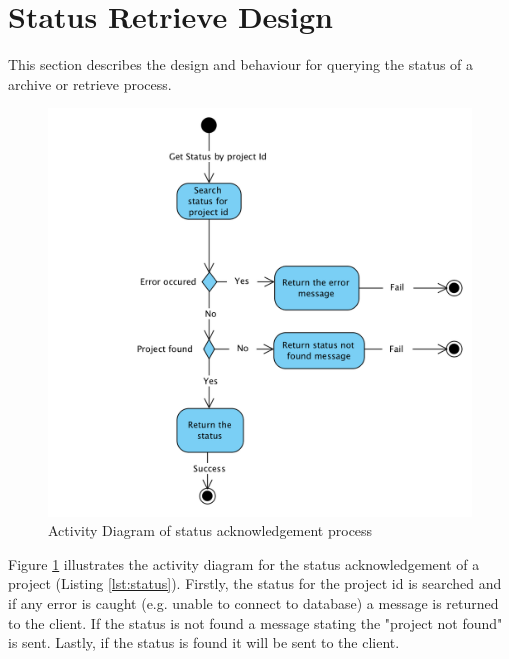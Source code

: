 \section{Status Retrieve Design}
This section describes the design and behaviour for querying the status of a archive or retrieve process.

\begin{figure}[H]
    \centering \includegraphics[scale=0.7]{grafiken/activityStatus.png}
    \caption{Activity Diagram of status acknowledgement process}
    \label{fig:activityStatus}
\end{figure}

Figure \ref{fig:activityStatus} illustrates the activity diagram for the status acknowledgement of a project (Listing \ref{lst:status}). Firstly,
the status for the project id is searched and if any error is caught (e.g. unable to connect to database) a message is returned to the client. If the 
status is not found a message stating the "project not found" is sent. Lastly, if the status is found it will be sent to the client.

